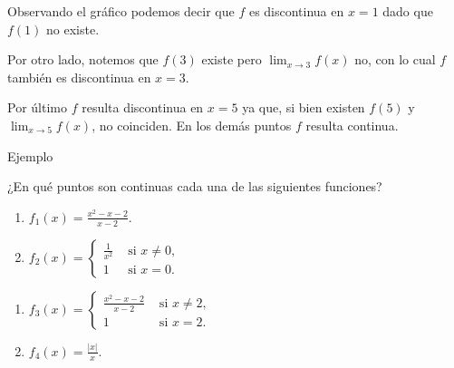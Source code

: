 \documentclass[
  letterpaper,
]{book}
\theoremstyle{plain}
\theoremstyle{remark}
\begin{document}
\begin{tcolorbox}[enhanced jigsaw, opacityback=0, left=2mm, opacitybacktitle=0.6, toprule=.15mm, bottomrule=.15mm, colbacktitle=quarto-callout-tip-color!10!white, titlerule=0mm, bottomtitle=1mm, title=\textcolor{quarto-callout-tip-color}{\faLightbulb}\hspace{0.5em}{Solución}, toptitle=1mm, colframe=quarto-callout-tip-color-frame, colback=white, breakable, rightrule=.15mm, arc=.35mm, leftrule=.75mm, coltitle=black]

Observando el gráfico podemos decir que \(f\) es discontinua en \(x=1\)
dado que \(f(1)\) no existe.

Por otro lado, notemos que \(f(3)\) existe pero
\(\displaystyle \lim_{x\to 3} f(x)\) no, con lo cual \(f\) también es
discontinua en \(x=3\).

Por último \(f\) resulta discontinua en \(x=5\) ya que, si bien existen
\(f(5)\) y \(\lim_{x\to 5} f(x)\), no coinciden. En los demás puntos
\(f\) resulta continua.

\end{tcolorbox}

Ejemplo

¿En qué puntos son continuas cada una de las siguientes funciones?

\begin{enumerate}
\def\labelenumi{\arabic{enumi}.}
\item
  \(\displaystyle f_1(x)=\frac{x^2-x-2}{x-2}\).
\item
  \(\displaystyle f_2(x)=\begin{cases}
  \frac{1}{x^2} & \text{ si } x\neq 0,\\
  1 & \text{ si } x=0.
  \end{cases}\)
\end{enumerate}

\begin{enumerate}
\def\labelenumi{\arabic{enumi}.}
\setcounter{enumi}{2}
\item
  \(\displaystyle f_3(x)=\begin{cases}
  \frac{x^2-x-2}{x-2} & \text{ si } x\neq 2,\\
  1 & \text{ si } x=2.
  \end{cases}\)
\item
  \(\displaystyle f_4(x)=\frac{|x|}{x}\).
\end{enumerate}
\end{document}
